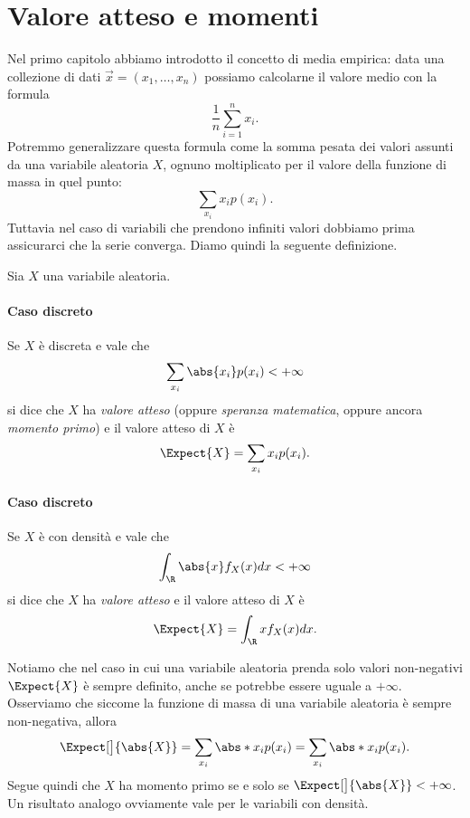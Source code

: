 \section{Valore atteso e momenti}

Nel primo capitolo abbiamo introdotto il concetto di media empirica: data una collezione di dati $\vec x = (x_1, \dots, x_n)$ possiamo calcolarne il valore medio con la formula \[
    \frac1n \sum_{i = 1}^n x_i. 
\] Potremmo generalizzare questa formula come la somma pesata dei valori assunti da una variabile aleatoria $X$, ognuno moltiplicato per il valore della funzione di massa in quel punto: \[
    \sum_{x_i} x_i p(x_i). 
\] Tuttavia nel caso di variabili che prendono infiniti valori dobbiamo prima assicurarci che la serie converga. Diamo quindi la seguente definizione.

\begin{definition}
     Sia $X$ una variabile aleatoria.
    \paragraph{Caso discreto} Se $X$ è discreta e vale che \[
        \sum_{x_i} \abs{x_i}p(x_i) < +\infty
    \] si dice che $X$ ha \emph{valore atteso} (oppure \emph{speranza matematica}, oppure ancora \emph{momento primo}) e il valore atteso di $X$ è \[
        \Expect{X} = \sum_{x_i} x_ip(x_i).    
    \]
    \paragraph{Caso discreto} Se $X$ è con densità e vale che \[
        \int_\R \abs{x}f_X(x)dx < +\infty
    \] si dice che $X$ ha \emph{valore atteso} e il valore atteso di $X$ è \[
        \Expect{X} = \int_\R xf_X(x)dx.    
    \]
\end{definition}



\begin{remark}
    Notiamo che nel caso in cui una variabile aleatoria prenda solo valori non-negativi $\Expect{X}$ è sempre definito, anche se potrebbe essere uguale a $+\infty$.
    Osserviamo che siccome la funzione di massa di una variabile aleatoria è sempre non-negativa, allora \[
        \Expect[\big]{\abs{X}} = \sum_{x_i} \abs*{x_ip(x_i)} = \sum_{x_i} \abs*{x_i}p(x_i).   
    \] Segue quindi che $X$ ha momento primo se e solo se $\Expect[\big]{\abs{X}} < +\infty$. Un risultato analogo ovviamente vale per le variabili con densità.
\end{remark}